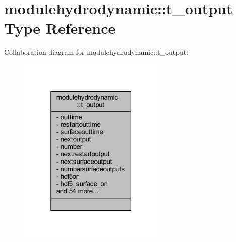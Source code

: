 \hypertarget{structmodulehydrodynamic_1_1t__output}{}\section{modulehydrodynamic\+:\+:t\+\_\+output Type Reference}
\label{structmodulehydrodynamic_1_1t__output}


Collaboration diagram for modulehydrodynamic\+:\+:t\+\_\+output\+:\nopagebreak
\begin{figure}[H]
\begin{center}
\leavevmode
\includegraphics[width=199pt]{structmodulehydrodynamic_1_1t__output__coll__graph}
\end{center}
\end{figure}
